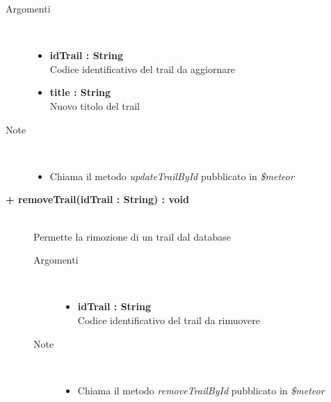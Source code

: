 \begin{description}
\begin{description}
		\begin{description}
			\item[Argomenti] \hfill \\
				\begin{itemize}
					\item \textbf{idTrail : String			} \hfill \\
					Codice identificativo del trail da aggiornare
					\item \textbf{title : String			} \hfill \\
					Nuovo titolo del trail
					
				\end{itemize}
			\item[Note] \hfill \\
			\begin{itemize}
					\item Chiama il metodo \textit{updateTrailById} pubblicato in \textit{\$meteor}
			\end{itemize}
		\end{description}
	\end{description}
	
	\begin{description}
		\item[\textbf{\color{blue}+ removeTrail(idTrail : String) : void			}] \hfill \\
			Permette la rimozione di un trail dal database
			
		\begin{description}
			\item[Argomenti] \hfill \\
				\begin{itemize}
					\item \textbf{idTrail : String			} \hfill \\
					Codice identificativo del trail da rimuovere
					
				\end{itemize}
			\item[Note] \hfill \\
			\begin{itemize}
					\item Chiama il metodo \textit{removeTrailById} pubblicato in \textit{\$meteor}
			\end{itemize}
		\end{description}
	\end{description}
	

\end{description}
